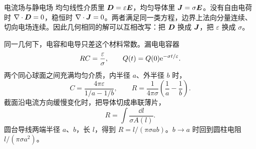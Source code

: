 \begin{frame}{电流场与静电场}
均匀线性介质里 $\bm{D}=\varepsilon\bm{E}$，均匀导体里 $\bm{J}=\sigma\bm{E}$。没有自由电荷时 $\nabla\cdot\bm{D}=0$，稳恒时 $\nabla\cdot\bm{J}=0$。两者满足同一类方程，边界上法向分量连续、切向电场连续。因此几何相同的解可以互相改写：把 $\bm{D}$ 换成 $\bm{J}$，把 $\varepsilon$ 换成 $\sigma$。

同一几何下，电容和电导只差这个材料常数。漏电电容器
\[
 RC=\frac{\varepsilon}{\sigma},\qquad
 Q(t)=Q(0)\mathrm e^{-\sigma t/\varepsilon}.
\]
两个同心球面之间充满均匀介质，内半径 $a$、外半径 $b$ 时，
\[
 C=\frac{4\pi\varepsilon}{1/a-1/b},\qquad
 R=\frac{1}{4\pi\sigma}\left(\frac1a-\frac1b\right).
\]
截面沿电流方向缓慢变化时，把导体切成串联薄片，
\[
 R=\int\frac{\dd l}{\sigma A(l)}.
\]
圆台导线两端半径 $a$、$b$，长 $l$，得到 $R=l/(\pi\sigma ab)$。$b\to a$ 时回到圆柱电阻 $l/(\pi\sigma a^2)$。
\end{frame}
